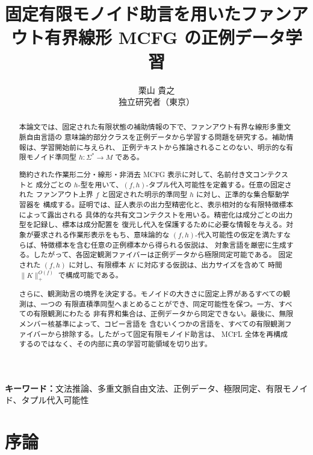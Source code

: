 \documentclass[11pt,a4paper]{ltjsarticle}
\title{固定有限モノイド助言を用いたファンアウト有界線形 MCFG の正例データ学習}
\author{栗山 貴之\\独立研究者（東京）}
\date{}
\theoremstyle{remark}
\providecommand{\keywords}[1]{\par\smallskip\noindent\textbf{キーワード：}#1\par}
\begin{document}
\setlength{\abovedisplayskip}{3pt}
\setlength{\belowdisplayskip}{3pt}
\setlength{\abovedisplayshortskip}{0pt}
\setlength{\belowdisplayshortskip}{0pt}

\maketitle
\vspace{-1em}

\begin{abstract}
本論文では、固定された有限状態の補助情報の下で、ファンアウト有界な線形多重文脈自由言語の
意味論的部分クラスを正例データから学習する問題を研究する。補助情報は、学習開始前に与えられ、
正例テキストから推論されることのない、明示的な有限モノイド準同型
\(h:\Sigma^*\to M\) である。

簡約された作業形二分・線形・非消去 MCFG 表示に対して、名前付き文コンテクストと
成分ごとの \(h\)-型を用いて、\((f,h)\)-タプル代入可能性を定義する。任意の固定された
ファンアウト上界 \(f\) と固定された明示的準同型 \(h\) に対し、正準的な集合駆動学習器を
構成する。証明では、証人表示の出力型精密化と、表示相対的な有限特徴標本によって露出される
具体的な共有文コンテクストを用いる。精密化は成分ごとの出力型を記録し、標本は成分配置を
復元し代入を保護するために必要な情報を与える。対象が要求される作業形表示をもち、意味論的な
\((f,h)\)-代入可能性の仮定を満たすならば、特徴標本を含む任意の正例標本から得られる仮説は、
対象言語を厳密に生成する。したがって、各固定観測ファイバーは正例データから極限同定可能である。
固定された \((f,h)\) に対し、有限標本 \(K\) に対応する仮説は、出力サイズを含めて
時間 \(\|K\|_+^{O(f)}\) で構成可能である。

さらに、観測助言の境界を決定する。モノイドの大きさに固定上界があるすべての観測は、一つの
有限直積準同型へまとめることができ、同定可能性を保つ。一方、すべての有限観測にわたる
非有界和集合は、正例データから同定できない。最後に、無限メンバー核基準によって、コピー言語を
含むいくつかの言語を、すべての有限観測ファイバーから排除する。したがって固定有限モノイド助言は、
MCFL 全体を再構成するのではなく、その内部に真の学習可能領域を切り出す。
\end{abstract}

\keywords{文法推論、多重文脈自由文法、正例データ、極限同定、有限モノイド、タプル代入可能性}

\section{序論}
\label{sec:introduction}
\end{document}
